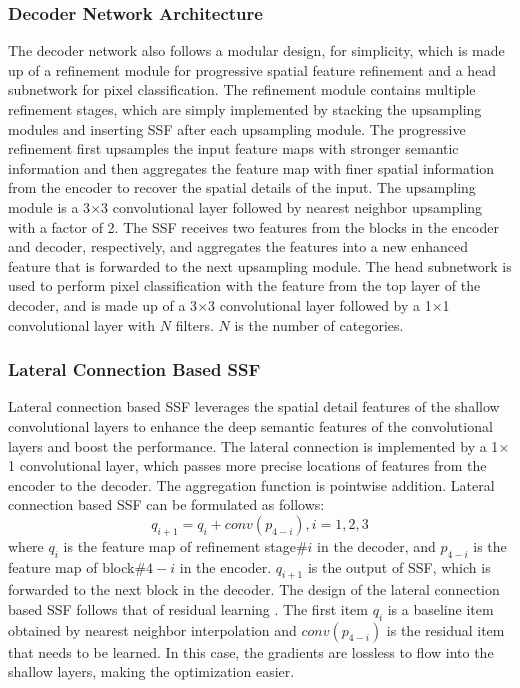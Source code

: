 \documentclass[journal]{IEEEtran}
\begin{document}
\subsubsection{\textbf{Decoder Network Architecture}}
The decoder network also follows a modular design, for simplicity, which is made up of a refinement module for progressive spatial feature refinement and a head subnetwork for pixel classification.
The refinement module contains multiple refinement stages, which are simply implemented by stacking the upsampling modules and inserting SSF after each upsampling module.
The progressive refinement first upsamples the input feature maps with stronger semantic information and then aggregates the feature map with finer spatial information from the encoder to recover the spatial details of the input.
The upsampling module is a 3$\times$3 convolutional layer followed by nearest neighbor upsampling with a factor of 2.
The SSF receives two features from the blocks in the encoder and decoder, respectively, and aggregates the features into a new enhanced feature that is forwarded to the next upsampling module.
The head subnetwork is used to perform pixel classification with the feature from the top layer of the decoder, and is made up of a 3$\times$3 convolutional layer followed by a 1$\times$1 convolutional layer with $N$ filters.
$N$ is the number of categories.

\subsubsection{\textbf{Lateral Connection Based SSF}}
\label{sec:ssf}
Lateral connection based SSF leverages the spatial detail features of the shallow convolutional layers to enhance the deep semantic features of the convolutional layers and boost the performance.
The lateral connection is implemented by a 1$\times$1 convolutional layer, which passes more precise locations of features from the encoder to the decoder.
The aggregation function is pointwise addition.
Lateral connection based SSF can be formulated as follows:
\begin{equation}
  q_{i+1} = q_i + conv(p_{4-i}), i = 1,2,3
\end{equation}
where $q_i$ is the feature map of refinement stage\#$i$ in the decoder, and $p_{4-i}$ is the feature map of block\#$4-i$ in the encoder.
$q_{i+1}$ is the output of SSF, which is forwarded to the next block in the decoder.
The design of the lateral connection based SSF follows that of residual learning \cite{he2016deep}.
The first item $q_i$ is a baseline item obtained by nearest neighbor interpolation and $conv(p_{4-i})$ is the residual item that needs to be learned.
In this case, the gradients are lossless to flow into the shallow layers, making the optimization easier.
\end{document}
